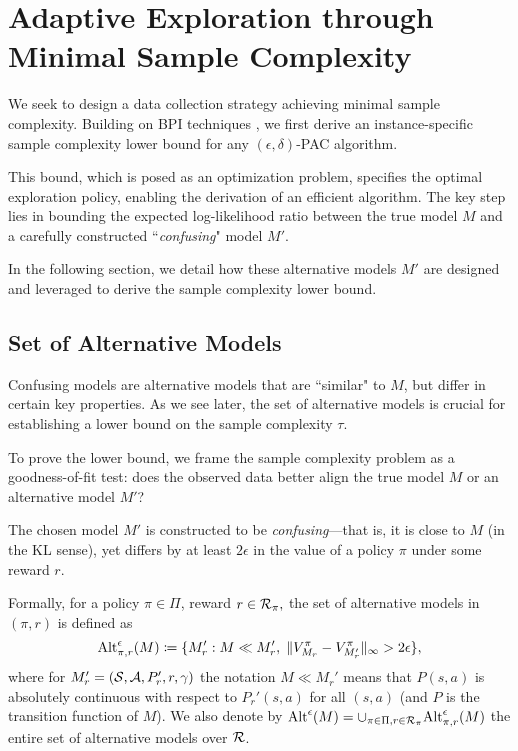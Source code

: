 \section{Adaptive  Exploration through Minimal Sample Complexity}\label{sec:lower_bound}
We seek to design a data collection strategy achieving minimal sample complexity.  Building on  BPI techniques \citep{garivier2016optimal,al2021navigating}, we first derive an instance-specific sample complexity lower bound for any $(\epsilon,\delta)$-PAC algorithm. 



This bound, which is posed as an optimization problem,  specifies the optimal exploration policy, enabling the derivation of an  efficient algorithm. The key step lies in bounding the expected log-likelihood ratio between the true model $M$ and a carefully constructed ``\emph{confusing}" model $M'$.


In the following section, we detail how these alternative models $M'$ are designed and leveraged to derive the sample complexity lower bound.


 

\subsection{Set of Alternative Models}
Confusing models are alternative models that are ``similar" to $M$, but differ in certain key properties. As we see later, the set of alternative models is crucial for establishing a lower bound on the sample complexity $\tau$.
 

To prove the lower bound, we frame the sample complexity problem as a goodness-of-fit test: does the observed data better align the true model $M$ or an alternative model $M'$?


The chosen model $M'$ is constructed to be \emph{confusing}—that is, it is close to $M$ (in the  KL sense), yet differs by at least $2\epsilon$ in the value of a policy $\pi$ under some reward $r$.


Formally, for a policy $\pi\in \Pi$, reward $r\in{\cal R}_\pi,$ the set of alternative models in $(\pi,r)$ is defined as
 \[{\rm Alt}_{\pi,r}^\epsilon(M) \coloneqq \{M_r': M\ll M_r', \; \|V_{M_r}^\pi - V_{M_r'}^\pi\|_\infty > 2\epsilon \},\] where for $M_r'=({\cal S}, {\cal A},P_r',r,\gamma)$ the notation $M\ll M_r'$ means that $P(s,a)$ is absolutely continuous with respect to $ P_r'(s,a)$ for all $(s,a)$ (and $P$ is the transition function of $M$).  We also denote by ${\rm Alt}^\epsilon(M)=\cup_{\pi\in \Pi,r\in {\cal R}_\pi}{\rm Alt}_{\pi,r}^\epsilon(M)$ the entire set of alternative models over ${\cal R}$.
  

